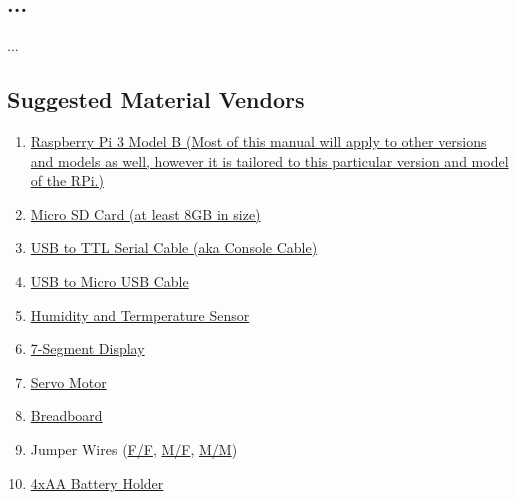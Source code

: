\documentclass{article}
\begin{document}
  \subsection{...}
    ...
\begin{appendices}
  \section{Suggested Material Vendors}
      \begin{enumerate}
        \item \href{https://www.sparkfun.com/products/13825}{Raspberry Pi 3 Model B (Most of this manual will apply to other versions and models as well, however it is tailored to this particular version and model of the RPi.)}
          \label{sec:vendor-rpi}
        \item \href{https://www.sparkfun.com/products/13833}{Micro SD Card (at least 8GB in size)}
          \label{sec:vendor-sd}
        \item \href{https://www.sparkfun.com/products/12977}{USB to TTL Serial Cable (aka Console Cable)}
          \label{sec:vendor-usbttlserial}
        \item \href{https://www.sparkfun.com/products/13244}{USB to Micro USB Cable}
          \label{sec:vendor-usbmusb}
        \item \href{https://www.sparkfun.com/products/13763}{Humidity and Termperature Sensor}
          \label{sec:vendor-sensor}
        \item \href{https://www.sparkfun.com/products/11442}{7-Segment Display}
          \label{sec:vendor-7seg}
        \item \href{https://www.sparkfun.com/products/9065}{Servo Motor}
          \label{sec:vendor-servo}
        \item \href{https://www.sparkfun.com/products/12002}{Breadboard}
          \label{sec:vendor-breadboard}
        \item Jumper Wires (\href{https://www.sparkfun.com/products/12796}{F/F}, \href{https://www.sparkfun.com/products/12794}{M/F}, \href{https://www.sparkfun.com/products/12795}{M/M})
          \label{sec:vendor-wires}
        \item \href{https://www.sparkfun.com/products/552}{4xAA Battery Holder}
          \label{sec:vendor-batholder}
      \end{enumerate}
\end{appendices}
%   
\end{document}
